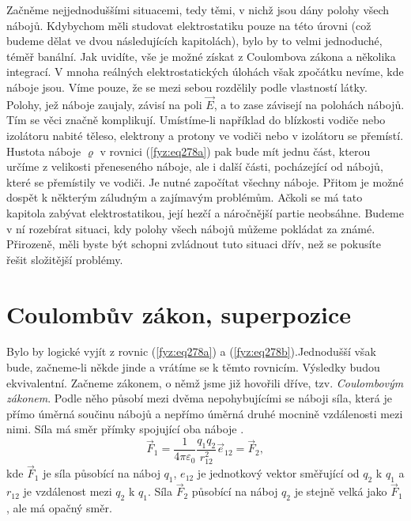 {    Začněme nejjednoduššími situacemi, tedy těmi, v nichž jsou dány polohy všech nábojů. Kdybychom 
    měli studovat elektrostatiku pouze na této úrovni (což budeme dělat ve dvou následujících 
    kapitolách), bylo by to velmi jednoduché, téměř banální. Jak uvidíte, vše je možné získat z 
    Coulombova zákona a  několika integrací. V mnoha reálných elektrostatických úlohách však 
    zpočátku nevíme, kde náboje jsou. Víme pouze, že se mezi sebou rozdělily podle vlastností 
    látky. Polohy, jež náboje zaujaly, závisí na poli \(\vec{E}\), a to zase závisejí na polohách 
    nábojů. Tím se věci značně komplikují. Umístíme-li například do blízkosti vodiče nebo izolátoru 
    nabité těleso, elektrony a protony ve vodiči nebo v izolátoru se přemístí. Hustota náboje 
    \(\varrho\) v rovnici (\ref{fyz:eq278a}) pak bude mít jednu část, kterou určíme z 
    velikosti přeneseného náboje, ale i další části, pocházející od nábojů, které se přemístily ve 
    vodiči. Je nutné započítat všechny náboje. Přitom je možné dospět k některým záludným a 
    zajímavým problémům. Ačkoli se má tato kapitola zabývat elektrostatikou, její hezčí a 
    náročnější partie neobsáhne. Budeme v ní rozebírat situaci, kdy polohy všech nábojů můžeme 
    pokládat za známé. Přirozeně, měli byste být schopni zvládnout tuto situaci dřív, než se 
    pokusíte řešit složitější problémy.
    
  \section{Coulombův zákon, superpozice}\hypertarget{fyz:IIchapIVsecII}{}
    Bylo by logické vyjít z rovnic (\ref{fyz:eq278a}) a   
    (\ref{fyz:eq278b}).Jednodušší však bude, začneme-li někde jinde a vrátíme se k těmto 
    rovnicím. Výsledky budou ekvivalentní. Začneme zákonem, o němž jsme již hovořili dříve, tzv. 
    \emph{Coulombovým zákonem}. Podle něho působí mezi dvěma nepohybujícími se náboji síla, která 
    je přímo úměrná součinu nábojů a nepřímo úměrná druhé mocnině vzdálenosti mezi nimi. Síla má 
    směr přímky spojující oba náboje \cite[s.~65]{Feynman02}.
    \begin{equation}\label{fyz:eq279}
      \boxed{
        \vec{F}_1=\frac{1}{4\pi\varepsilon_0}\frac{q_1q_2}{r_{12}^2}\vec{e}_{12} = \vec{F}_2,
      }
    \end{equation}
    kde \(\vec{F}_1\) je síla působící na náboj \(q_1\), \(e_{12}\) je jednotkový vektor směřující 
    od \(q_2\) k \(q_1\) a \(r_{12}\) je vzdálenost mezi \(q_2\) k \(q_1\). Síla \(\vec{F}_2\) 
    působící na náboj \(q_2\) je stejně velká jako \(\vec{F}_1\), ale má opačný směr.
     
}
